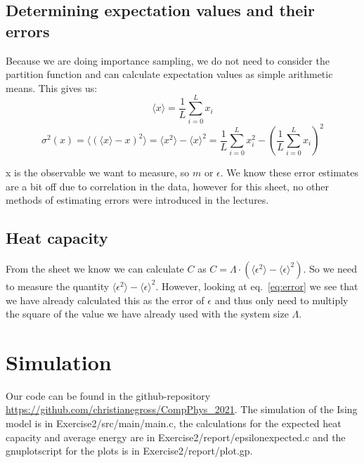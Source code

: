 \documentclass{scrartcl}
\begin{document}
\subsection{Determining expectation values and their errors}

Because we are doing importance sampling, we do not need to consider the partition function and can calculate expectation values as simple arithmetic means. This gives us:
\begin{equation}
\langle x\rangle=\frac{1}{L}\sum_{i=0}^{L} x_i
\end{equation}
\begin{equation}
\sigma^2(x)=\langle (\langle x\rangle-x)^2\rangle=\langle x^2\rangle-\langle x\rangle^2=\frac{1}{L}\sum_{i=0}^{L} x_i^2-\left( \frac{1}{L}\sum_{i=0}^{L} x_i\right) ^2
\label{eq:error}
\end{equation}

x is the observable we want to measure, so $m$ or $\epsilon$. We know these error estimates are a bit off due to correlation in the data, however for this sheet, no other methods of estimating errors were introduced in the lectures.

\subsection{Heat capacity}
\label{subsec:heattheory}

From the sheet we know we can calculate $C$ as $C=\Lambda\cdot(\langle \epsilon^2\rangle-\langle \epsilon\rangle^2)$. So we need to measure the quantity $\langle \epsilon^2\rangle-\langle \epsilon\rangle^2$. However, looking at eq.~\ref{eq:error} we see that we have already calculated this as the error of $\epsilon$ and thus only need to multiply the square of the value we have already used with the system size $\Lambda$.

\section{Simulation}

Our code can be found in the github-repository \url{https://github.com/christianegross/CompPhys\_2021}. The simulation of the Ising model is in Exercise2/src/main/main.c, the calculations for the expected heat capacity and average energy are in Exercise2/report/epsilonexpected.c and the gnuplotscript for the plots is in Exercise2/report/plot.gp.
\end{document}
